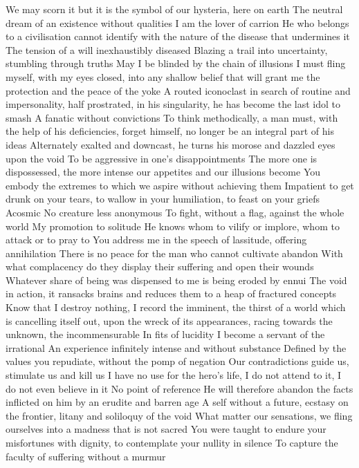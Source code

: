 \documentclass{article}
\begin{document}
We may scorn it but it is the symbol of our hysteria, here on earth
The neutral dream of an existence without qualities
I am the lover of carrion
He who belongs to a civilisation cannot identify with the nature of the disease that undermines it
The tension of a will inexhaustibly diseased
Blazing a trail into uncertainty, stumbling through truths
May I be blinded by the chain of illusions
I must fling myself, with my eyes closed, into any shallow belief that will grant me the protection and the peace of the yoke
A routed iconoclast in search of routine and impersonality, half prostrated, in his singularity, he has become the last idol to smash
A fanatic without convictions
To think methodically, a man must, with the help of his deficiencies, forget himself, no longer be an integral part of his ideas
Alternately exalted and downcast, he turns his morose and dazzled eyes upon the void
To be aggressive in one's disappointments
The more one is dispossessed, the more intense our appetites and our illusions become
You embody the extremes to which we aspire without achieving them
Impatient to get drunk on your tears, to wallow in your humiliation, to feast on your griefs
Acosmic
No creature less anonymous
To fight, without a flag, against the whole world
My promotion to solitude
He knows whom to vilify or implore, whom to attack or to pray to
You address me in the speech of lassitude, offering annihilation
There is no peace for the man who cannot cultivate abandon
With what complacency do they display their suffering and open their wounds
Whatever share of being was dispensed to me is being eroded by ennui
The void in action, it ransacks brains and reduces them to a heap of fractured concepts
Know that I destroy nothing, I record the imminent, the thirst of a world which is cancelling itself out, upon the wreck of its appearances, racing towards the unknown, the incommensurable
In fits of lucidity I become a servant of the irrational
An experience infinitely intense and without substance
Defined by the values you repudiate, without the pomp of negation
Our contradictions guide us, stimulate us and kill us
I have no use for the hero's life, I do not attend to it, I do not even believe in it
No point of reference
He will therefore abandon the facts inflicted on him by an erudite and barren age
A self without a future, ecstasy on the frontier, litany and soliloquy of the void
What matter our sensations, we fling ourselves into a madness that is not sacred
You were taught to endure your misfortunes with dignity, to contemplate your nullity in silence
To capture the faculty of suffering without a murmur
\end{document}

